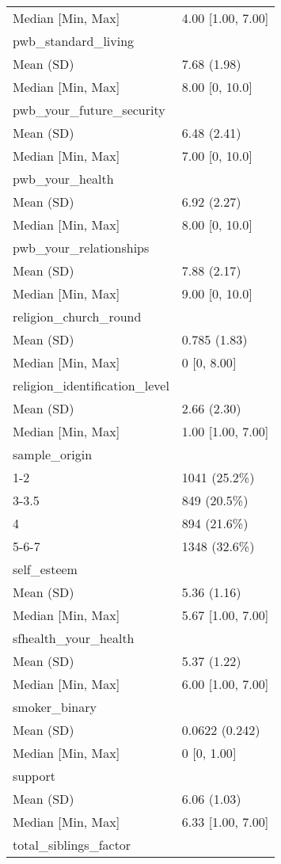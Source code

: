 \documentclass[
  singlecolumn,
  9pt]{article}
\begin{document}
\begin{longtable}[]{@{}ll@{}}
Median {[}Min, Max{]} & 4.00 {[}1.00, 7.00{]} \\
pwb\_standard\_living & \\
Mean (SD) & 7.68 (1.98) \\
Median {[}Min, Max{]} & 8.00 {[}0, 10.0{]} \\
pwb\_your\_future\_security & \\
Mean (SD) & 6.48 (2.41) \\
Median {[}Min, Max{]} & 7.00 {[}0, 10.0{]} \\
pwb\_your\_health & \\
Mean (SD) & 6.92 (2.27) \\
Median {[}Min, Max{]} & 8.00 {[}0, 10.0{]} \\
pwb\_your\_relationships & \\
Mean (SD) & 7.88 (2.17) \\
Median {[}Min, Max{]} & 9.00 {[}0, 10.0{]} \\
religion\_church\_round & \\
Mean (SD) & 0.785 (1.83) \\
Median {[}Min, Max{]} & 0 {[}0, 8.00{]} \\
religion\_identification\_level & \\
Mean (SD) & 2.66 (2.30) \\
Median {[}Min, Max{]} & 1.00 {[}1.00, 7.00{]} \\
sample\_origin & \\
1-2 & 1041 (25.2\%) \\
3-3.5 & 849 (20.5\%) \\
4 & 894 (21.6\%) \\
5-6-7 & 1348 (32.6\%) \\
self\_esteem & \\
Mean (SD) & 5.36 (1.16) \\
Median {[}Min, Max{]} & 5.67 {[}1.00, 7.00{]} \\
sfhealth\_your\_health & \\
Mean (SD) & 5.37 (1.22) \\
Median {[}Min, Max{]} & 6.00 {[}1.00, 7.00{]} \\
smoker\_binary & \\
Mean (SD) & 0.0622 (0.242) \\
Median {[}Min, Max{]} & 0 {[}0, 1.00{]} \\
support & \\
Mean (SD) & 6.06 (1.03) \\
Median {[}Min, Max{]} & 6.33 {[}1.00, 7.00{]} \\
total\_siblings\_factor & \\

\end{longtable}
\end{document}
